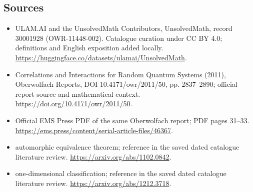 \documentclass[11pt]{article}
\begin{document}
\subsection{Sources}
\begin{itemize}
\item[\hypertarget{source:30001928:1}{S1}] ULAM.AI and the UnsolvedMath Contributors, UnsolvedMath, record 30001928 (OWR-11448-002). Catalogue curation under CC BY 4.0; definitions and English exposition added locally.
\url{https://huggingface.co/datasets/ulamai/UnsolvedMath}.
\item[\hypertarget{source:30001928:2}{S2}] Correlations and Interactions for Random Quantum Systems (2011), Oberwolfach Reports, DOI 10.4171/owr/2011/50, pp. 2837--2890; official report source and mathematical context.
\url{https://doi.org/10.4171/owr/2011/50}.
\item[\hypertarget{source:30001928:3}{S3}] Official EMS Press PDF of the same Oberwolfach report; PDF pages 31--33.
\url{https://ems.press/content/serial-article-files/46367}.
\item[\hypertarget{source:30001928:4}{S4}] automorphic equivalence theorem; reference in the saved dated catalogue literature review.
\url{https://arxiv.org/abs/1102.0842}.
\item[\hypertarget{source:30001928:5}{S5}] one-dimensional classification; reference in the saved dated catalogue literature review.
\url{https://arxiv.org/abs/1212.3718}.
\end{itemize}
\label{end:30001928}
\end{document}
